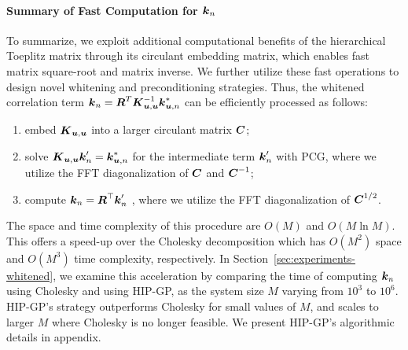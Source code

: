 \paragraph{Summary of Fast Computation for $\boldsymbol{k}_n$}
To summarize, we exploit additional computational benefits of
the hierarchical Toeplitz matrix through its circulant embedding matrix, which enables fast matrix square-root and matrix inverse. We further utilize these fast operations to design novel whitening and preconditioning strategies. 
Thus, the whitened correlation term $\boldsymbol{k}_n = \boldsymbol{R}^T \boldsymbol{K}_{\boldsymbol{u}, \boldsymbol{u}}^{-1} \boldsymbol{k}^*_{\boldsymbol{u}, n}$
can be efficiently processed as follows:
\begin{enumerate}
  \item embed $\boldsymbol{K}_{\boldsymbol{u}, \boldsymbol{u}}$ into a larger circulant matrix $\boldsymbol{C}$;
  \item solve $\boldsymbol{K}_{\boldsymbol{u}, \boldsymbol{u}} \boldsymbol{k}'_n = \boldsymbol{k}^*_{\boldsymbol{u}, n}$ for the  intermediate term $\boldsymbol{k}'_n$ with PCG,
  where we utilize the FFT diagonalization of $\boldsymbol{C}$ and $\boldsymbol{C}^{-1}$;
  \item compute $\boldsymbol{k}_n = \boldsymbol{R}^\top \boldsymbol{k}'_n$ , where we utilize the FFT diagonalization of $\boldsymbol{C}^{1/2}$.
\end{enumerate}
The space and time complexity of this procedure are $O(M)$ and $O(M \ln M)$.
This offers a speed-up over the Cholesky decomposition which has $O(M^2)$ space and $O(M^3)$ time complexity, respectively.
In Section~\ref{sec:experiments-whitened}, we examine this acceleration by comparing the time of computing $\boldsymbol{k}_n$ using Cholesky and using HIP-GP, as the system size $M$ varying from $10^3$ to $10^6$. HIP-GP's strategy outperforms Cholesky for small values of $M$, and scales to larger $M$ where Cholesky is no longer feasible. We present HIP-GP's algorithmic details in appendix. 

